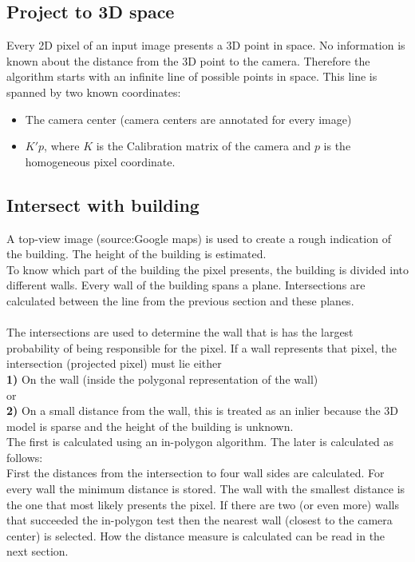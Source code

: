 \documentclass[10pt]{article}
\begin{document}
\subsection{Project to 3D space}
Every 2D pixel of an input image presents a 3D point in space. No
information is known about the distance from the 3D point to the camera.
Therefore the algorithm starts with an infinite line of possible points in space.
This line is spanned by two known coordinates:\\
\begin{itemize}
	\item The camera center (camera centers are annotated for every image)
	\item $K'p$, where $K$ is the Calibration matrix of the camera and $p$ is the homogeneous pixel coordinate.
\end{itemize}

\subsection{Intersect with building}
A top-view image (source:Google maps) is used to create a rough indication of the building. The height of the building is estimated.\\
To know which part of the building the pixel presents, the building is divided into different walls.  Every wall of the building spans a plane. Intersections are calculated between the line from the previous section and these planes.\\
\\
The intersections are used to determine the wall that is has the largest probability of being responsible for the pixel. 
If a wall represents that pixel, the intersection (projected pixel) must lie either\\
\textbf{1)} On the wall (inside the polygonal representation of the wall)
\\
or
\\
\textbf{2)} On a small distance from the wall, this is treated as an inlier because the 3D model is sparse and the height of the building is unknown.
\\
The first is calculated using an in-polygon algorithm. The later is calculated as follows:
\\
First the distances from the intersection to four wall sides are calculated. For every wall the minimum distance is stored. The wall with the smallest distance is the one that most likely presents the pixel. If there are two (or even more) walls that succeeded the in-polygon test then the nearest wall (closest to the camera center) is selected. How the distance measure is calculated can be read in the next section.
\end{document}
